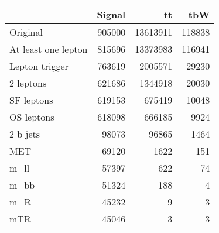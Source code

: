 \begin{tabular}{lrrr}
\toprule
{} &  Signal &        tt &     tbW \\
\midrule
Original            &  905000 &  13613911 &  118838 \\
At least one lepton &  815696 &  13373983 &  116941 \\
Lepton trigger      &  763619 &   2005571 &   29230 \\
2 leptons           &  621686 &   1344918 &   20030 \\
SF leptons          &  619153 &    675419 &   10048 \\
OS leptons          &  618098 &    666185 &    9924 \\
2 b jets            &   98073 &     96865 &    1464 \\
MET                 &   69120 &      1622 &     151 \\
m_ll                &   57397 &       622 &      74 \\
m_bb                &   51324 &       188 &       4 \\
m_R                 &   45232 &         9 &       3 \\
mTR                 &   45046 &         3 &       3 \\
\bottomrule
\end{tabular}

